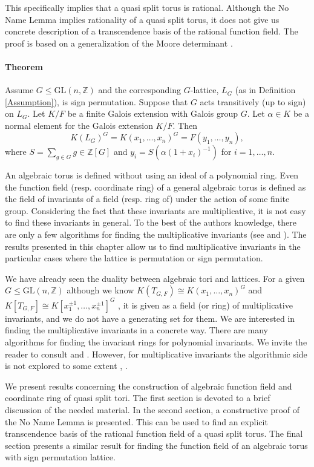 \documentclass[12pt]{article}
\theoremstyle{plain}
\newcommand{\Z}{\ensuremath{\mathbb{Z}}}
\begin{document}
This specifically implies that a quasi split torus is
rational. Although the No Name Lemma implies rationality of a quasi
split torus, it does not give us concrete description of a
transcendence basis of the rational function field.  The proof is
based on a generalization of the Moore determinant \cite[Section
  1.3]{Goss}.

\paragraph{Theorem}
Assume $G \leq \mathrm{GL}(n,\Z)$ and the corresponding $G$-lattice,
$L_G$ (as in Definition \ref{Assumption}), is sign
permutation. Suppose that $G$ acts transitively (up to sign) on
$L_G$. Let $K/F$ be a finite Galois extension with Galois group
$G$. Let $\alpha \in K$ be a normal element for the Galois extension
$K/F$. Then
$$K(L_G)^G = K(x_1,\ldots, x_n)^G = F(y_1, \ldots, y_{n}),$$ where $S
= \sum_{g \in G} g \in \Z[G]$ and $y_i = S(\alpha (1+x_i)^{-1})$ for $
i = 1, \ldots, n$.

An algebraic torus is defined without using an ideal of a polynomial
ring. Even the function field (resp. coordinate ring) of a general
algebraic torus is defined as the field of invariants of a field
(resp. ring of) under the action of some finite group. Considering the
fact that these invariants are multiplicative, it is not easy to find
these invariants in general. To the best of the authors knowledge,
there are only a few algorithms for finding the multiplicative
invariants (see \cite{Kemper} and \cite{Lorenz}). The results
presented in this chapter allow us to find multiplicative invariants
in the particular cases where the lattice is permutation or sign
permutation.

We have already seen the duality between algebraic tori and
lattices. For a given $G \leq \mathrm{GL}(n,\Z)$ although we know
$K(T_{G,F}) \cong K(x_1, \ldots, x_n)^G$ and $K[T_{G,F}] \cong
K[x^{\pm 1}_1, \ldots , x^{\pm 1}_n]^G$ , it is given as a field (or
ring) of multiplicative invariants, and we do not have a generating
set for them. We are interested in finding the multiplicative
invariants in a concrete way.  There are many algorithms for finding
the invariant rings for polynomial invariants. We invite the reader to
consult \cite{Kemper2} and \cite{Sturmfels}. However, for
multiplicative invariants the algorithmic side is not explored to some
extent \cite{Kemper}, \cite{Renault}.

We present results concerning the construction of algebraic function
field and coordinate ring of quasi split tori. The first section is
devoted to a brief discussion of the needed material. In the second
section, a constructive proof of the No Name Lemma is presented. This
can be used to find an explicit transcendence basis of the rational
function field of a quasi split torus. The final section presents a
similar result for finding the function field of an algebraic torus
with sign permutation lattice.
\end{document}
